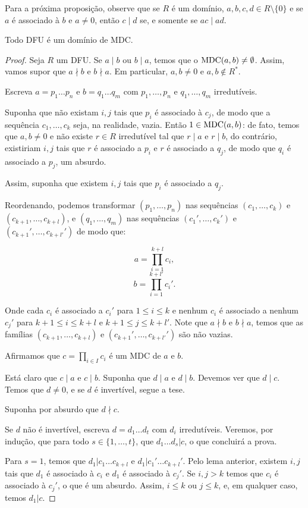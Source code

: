 Para a próxima proposição, observe que se $R$ é um domínio, $a, b, c, d \in R\setminus \{0\}$ e se $a$ é associado à $b$ e $a\neq 0$, então $c\mid d$ se, e somente se $ac\mid ad$.
\begin{prop}\label{prop:DfuMdc}
    Todo DFU é um domínio de MDC.
\end{prop}
\begin{proof}
Seja $R$ um DFU.
Se $a\mid b$ ou $b\mid a$, temos que o $\operatorname{MDC}(a, b)\neq \emptyset$.
Assim, vamos supor que $a\nmid b$ e $b\nmid a$. Em particular, $a, b \neq 0$ e $a, b \notin R^*$.

Escreva $a=p_1\dots p_n$ e $b=q_1\dots q_m$ com $p_1, \dots, p_n$ e $q_1, \dots, q_m$ irredutíveis.

Suponha que não existam $i, j$ tais que $p_i$ é associado à $c_j$, de modo que a sequência $c_1, \dots, c_k$ seja, na realidade, vazia. Então $1\in \operatorname{MDC}(a, b)$: de fato, temos que $a, b \neq 0$ e não existe $r \in R$ irredutível tal que $r\mid a$ e $r\mid b$, do contrário, existiriam $i, j$ tais que $r$ é associado a $p_i$ e $r$ é associado a $q_j$, de modo que $q_i$ é associado a $p_j$, um absurdo.

Assim, suponha que existem $i, j$ tais que $p_i$ é associado a $q_j$.

Reordenando, podemos transformar $(p_1, \dots, p_n)$ nas sequências $(c_1, \dots, c_k)$ e $(c_{k+1}, \dots, c_{k+l})$, e $(q_1, \dots, q_m)$ nas sequências $(c_1', \dots, c_k')$ e $(c_{k+1}', \dots, c_{k+l'}')$ de modo que:

\[a=\prod_{i=1}^{k+l}c_i,\]
\[b=\prod_{i=1}^{k+l'}c_i'.\]

Onde cada $c_i$ é associado a $c_i'$ para $1\leq i\leq k$ e nenhum $c_i$ é associado a nenhum $c_j'$ para $k+1\leq i\leq k+l$ e $k+1\leq j\leq k+l'$.
Note que $a\nmid b$ e $b\nmid  a$, temos que as famílias $(c_{k+1}, \dots, c_{k+l})$ e $(c_{k+1}', \dots, c_{k+l'}')$ são não vazias.

Afirmamos que $c=\prod_{i \in I} c_i$ é um MDC de $a$ e $b$.

Está claro que $c\mid a$ e $c\mid b$.
Suponha que $d\mid a$ e $d\mid b$.
Devemos ver que $d\mid c$.
Temos que $d\neq 0$, e se $d$ é invertível, segue a tese.

Suponha por absurdo que $d\nmid  c$.

Se $d$ não é invertível, escreva $d=d_1\dots d_t$ com $d_i$ irredutíveis. Veremos, por indução, que para todo $s\in\{1, \dots, t\}$, que $d_1\dots d_s|c$, o que concluirá a prova.

Para $s=1$, temos que $d_1|c_1\dots c_{k+l}$ e $d_1|c_1'\dots c_{k+l}'$. Pelo lema anterior, existem $i, j$ tais que $d_1$ é associado à $c_i$ e $d_1$ é associado à $c_j'$. Se $i, j>k$ temos que $c_i$ é associado à $c_j'$, o que é um absurdo. Assim, $i\leq k$ ou $j\leq k$, e, em qualquer caso, temos $d_1|c$.


\end{proof}
